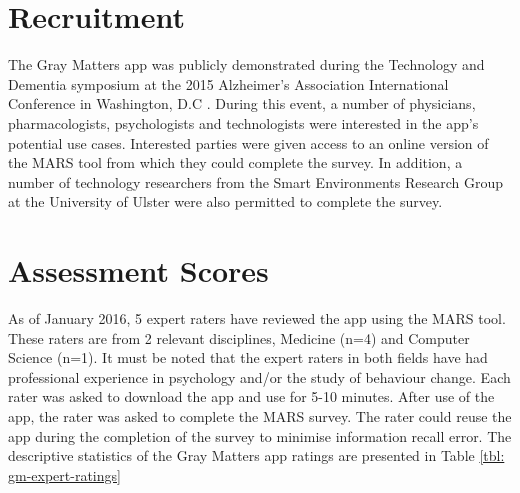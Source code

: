 \begin{table}[h]
\centering
\caption{Intraclass Correlation Coefficient for Pilot vs Re-evaluation.}
\label{tbl: intraclass-pilot-reevaluation}
\end{table}

\section{Recruitment}
The Gray Matters app was publicly demonstrated during the Technology and Dementia symposium at the 2015 Alzheimer's Association International Conference in Washington, D.C \cite{AlzheimersAssociation2015}. During this event, a number of physicians, pharmacologists, psychologists and technologists were interested in the app's potential use cases. Interested parties were given access to an online version of the MARS tool from which they could complete the survey. In addition, a number of technology researchers from the Smart Environments Research Group at the University of Ulster were also permitted to complete the survey.

\section{Assessment Scores}
As of January 2016, 5 expert raters have reviewed the app using the MARS tool. These raters are from 2 relevant disciplines, Medicine (n=4) and Computer Science (n=1). It must be noted that the expert raters in both fields have had professional experience in psychology and/or the study of behaviour change.
Each rater was asked to download the app and use for 5-10 minutes. After use of the app, the rater was asked to complete the MARS survey. The rater could reuse the app during the completion of the survey to minimise information recall error. The descriptive statistics of the Gray Matters app ratings are presented in Table \ref{tbl: gm-expert-ratings}

